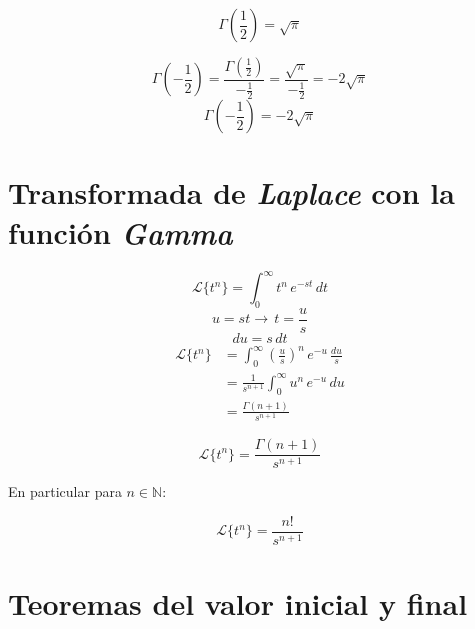 \begin{equation}
    \Gamma\left(\frac{1}{2}\right)=\sqrt{\pi}
\end{equation}

\begin{equation*}
    \Gamma\left(-\frac{1}{2}\right)
        =\frac{\Gamma(\frac{1}{2})}{-\frac{1}{2}}
        =\frac{\sqrt{\pi}}{-\frac{1}{2}}
        =-2\sqrt{\pi}
\end{equation*}
\begin{equation}
    \Gamma\left(-\frac{1}{2}\right)=-2\sqrt{\pi}
\end{equation}

\section{Transformada de \emph{Laplace} con la función \emph{Gamma}}

\begin{equation*}
    \mathcal{L}\{t^n\}=\int_0^{\infty}t^n\,e^{-st}\,dt
\end{equation*}
\begin{equation*}
    u=st\rightarrow\,t=\frac{u}{s}
\end{equation*}
\begin{equation*}
    du=s\,dt
\end{equation*}
\begin{equation*}
\begin{split}
    \mathcal{L}\{t^n\}
        &=\int_0^{\infty}{\left(\frac{u}{s}\right)}^n\,e^{-u}\,\frac{du}{s}\\
        &=\frac{1}{s^{n+1}}\int_0^{\infty}u^n\,e^{-u}\,du\\
        &=\frac{\Gamma(n+1)}{s^{n+1}}
\end{split}
\end{equation*}

\begin{equation}
    \mathcal{L}\{t^n\}=\frac{\Gamma(n+1)}{s^{n+1}}
\end{equation}

En particular para $n\in\mathbb{N}$:

\begin{equation}
    \mathcal{L}\{t^n\}=\frac{n!}{s^{n+1}}
\end{equation}

\section{Teoremas del valor inicial y final}

